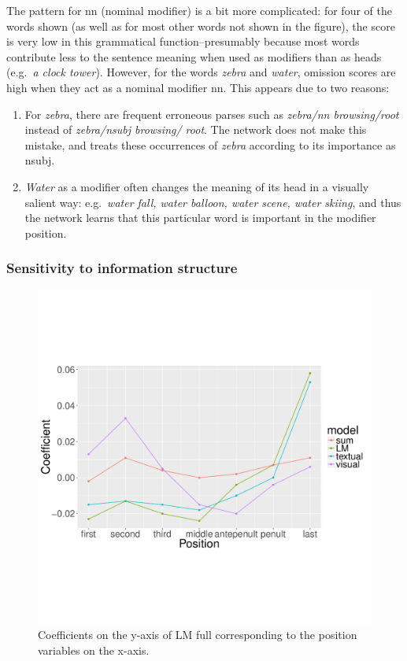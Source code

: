 The pattern for {\sc nn} (nominal modifier) is a bit more complicated: for
four of the words shown (as well as for most other words not shown in
the figure), the score is very low in this grammatical function--presumably 
because most words contribute less to the sentence meaning when used  
as modifiers than as heads (e.g.\ {\it a clock tower}). However,
for the words {\it zebra} and {\it water}, omission scores are high
when they act as a nominal modifier {\sc nn}. This appears due to two reasons:
\begin{enumerate}
\item For {\it zebra}, there are frequent erroneous parses such as {\it
    zebra/{\sc nn} browsing/{\sc root}} instead of {\it zebra/{\sc nsubj} browsing/{\sc
    root}}. The network does not make this mistake, and treats these
    occurrences of {\it zebra} according to its importance as {\sc nsubj}.
\item {\it Water} as a modifier often changes the meaning of its head in
 a visually salient way: e.g.\ {\it water fall, water balloon, water scene, water skiing}, and
  thus the network learns that this particular word is important in the modifier position.
\end{enumerate}

\subsubsection{Sensitivity to information structure}
\label{subsec:information-struct}

\begin{figure}
\centering
 \includegraphics[scale=0.4]{position-coef.pdf}
 \caption{Coefficients on the y-axis of {\sc LM full} corresponding to the
position variables on the x-axis.}
 \label{fig:posrqs}
\end{figure}
 
